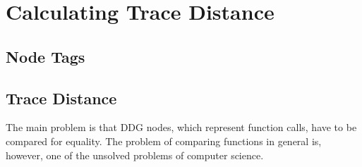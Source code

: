 
\chapter{Calculating Trace Distance}
\label{ch:implementation}

\section{Node Tags}

\section{Trace Distance}
The main problem is that DDG nodes, which represent function calls, have to be compared for equality. The problem of comparing functions in general is, however, one of the unsolved problems of computer science. 






